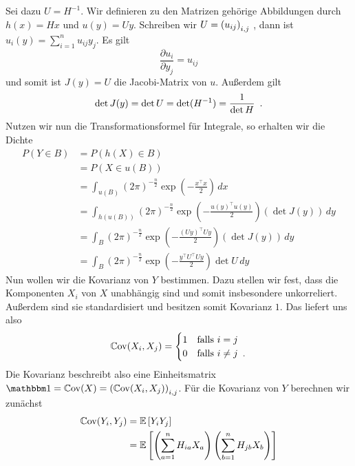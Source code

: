 \documentclass[ngerman, a4paper, 11pt]{article}
\theoremstyle{plain}
\theoremstyle{plain}
\theoremstyle{proofstyle}
\renewcommand{\Cov}{\operatorname{\mathbb Cov}}
\newcommand{\satzende}{\enskip \text{.}}
\begin{document}
\begin{exercisePage}
\begin{enumerate}[label=(\alph*), leftmargin=*]
	Sei dazu $U = H^{-1}$. Wir definieren zu den Matrizen gehörige Abbildungen durch $h({ x})= H { x}$ und $u({ y}) = U { y}$. Schreiben wir $U = \left( u_{ij} \right)_{i,j}$ 
	, dann ist $u_i({ y}) = \sum_{i=1}^n u_{ij} y_j$. Es gilt 
	\begin{equation*}
		\frac{\partial u_i}{\partial y_j}= u_{ij}
	\end{equation*}
	und somit ist $J({ y})=U$ die Jacobi-Matrix von $u$. Außerdem gilt
	\begin{equation*}
		\det J({ y})=\det U = \det (H^{-1}) =\frac{1}{\det H} \satzende
	\end{equation*}
	Nutzen wir nun die Transformationsformel für Integrale, so erhalten wir die Dichte
	\begin{align*}
		P({ Y} \in B)&=P(h(X) \in B) \\
		&=P({ X} \in u(B)) \\
		&= \int_{u(B)} (2 \pi)^{-\frac{n}{2}} \exp \left( -\frac{{ x}^\top { x}}{2} \right) \, d { x} \\
		&= \int_{h(u(B))} (2 \pi)^{-\frac{n}{2}} \exp \left( -\frac{u({ y})^\top u({ y})}{2} \right) (\det J({ y})) \, d { y} \\
		&= \int_{B} (2 \pi)^{-\frac{n}{2}} \exp \left( -\frac{(U { y})^\top U { y}}{2} \right) (\det J({ y})) \, d { y} \\
		&= \int_{B} (2 \pi)^{-\frac{n}{2}} \exp \left( -\frac{{ y}^\top U^\top U { y}}{2} \right) \det{U} \, d { y}
	\end{align*}
	Nun wollen wir die Kovarianz von $Y$ bestimmen. Dazu stellen wir fest, dass die Komponenten $X_i$ von $X$ unabhängig sind und somit insbesondere unkorreliert. Außerdem sind sie standardisiert und besitzen somit Kovarianz $1$. Das liefert uns also
	\begin{equation*}
		\Cov(X_i, X_j) = \begin{cases}
		1 & \text{falls } i = j \\
		0 & \text{falls } i \neq j \satzende
		\end{cases}
	\end{equation*}
	Die Kovarianz beschreibt also eine Einheitsmatrix $\one = \Cov(X) =  \brackets{\Cov(X_i, X_j)}_{i,j}$.
	Für die Kovarianz von $Y$ berechnen wir zunächst
	\begin{align*}
		\Cov(Y_i,Y_j)&= \EW[Y_i Y_j] \\
		&= \E\left[ \left( \sum_{a=1}^n H_{ia} X_a \right) \left( \sum_{b=1}^n H_{jb} X_b \right) \right] \\

\end{align*}
\end{enumerate}
\end{exercisePage}
\end{document}
